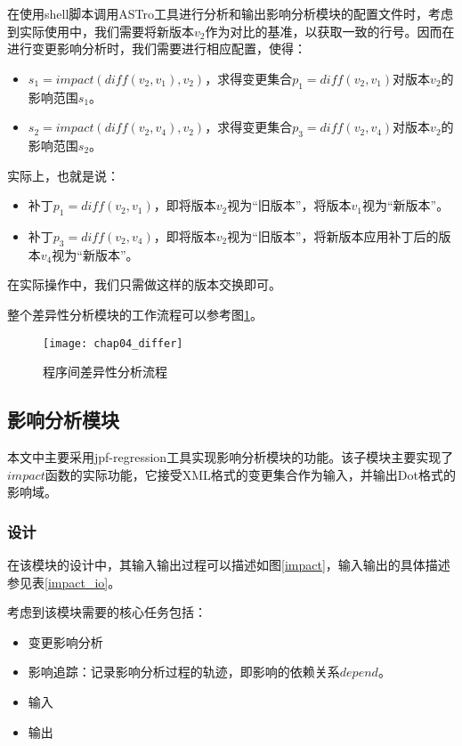 在使用shell脚本调用ASTro工具进行分析和输出影响分析模块的配置文件时，考虑到实际使用中，我们需要将新版本$v_2$作为对比的基准，以获取一致的行号。因而在进行变更影响分析时，我们需要进行相应配置，使得：
\begin{itemize}
	\item $s_1 = impact(diff(v_2,v_1),v_2)$，求得变更集合$p_1 = diff(v_2,v_1)$对版本$v_2$的影响范围$s_1$。
	\item $s_2 = impact(diff(v_2,v_4),v_2)$，求得变更集合$p_3 = diff(v_2,v_4)$对版本$v_2$的影响范围$s_2$。
\end{itemize}

实际上，也就是说：
\begin{itemize}
	\item 补丁$p_1 = diff(v_2,v_1)$，即将版本$v_2$视为“旧版本”，将版本$v_1$视为“新版本”。
	\item 补丁$p_3 = diff(v_2,v_4)$，即将版本$v_2$视为“旧版本”，将新版本应用补丁后的版本$v_4$视为“新版本”。
\end{itemize}

在实际操作中，我们只需做这样的版本交换即可。

整个差异性分析模块的工作流程可以参考图\ref {diff}。

\begin{figure}[H]
	\centering
	\texttt{[image: chap04\_differ]}
	\caption {程序间差异性分析流程}
	\label {diff}	
\end{figure}

\subsection{影响分析模块}

本文中主要采用jpf-regression工具实现影响分析模块的功能。该子模块主要实现了$impact$函数的实际功能，它接受XML格式的变更集合作为输入，并输出Dot格式的影响域。

\subsubsection{设计}

在该模块的设计中，其输入输出过程可以描述如图\ref {impact}，输入输出的具体描述参见表\ref {impact_io}。

考虑到该模块需要的核心任务包括：
\begin{itemize}
	\item 变更影响分析
	\item 影响追踪：记录影响分析过程的轨迹，即影响的依赖关系$depend$。
	\item 输入
	\item 输出
\end{itemize}

